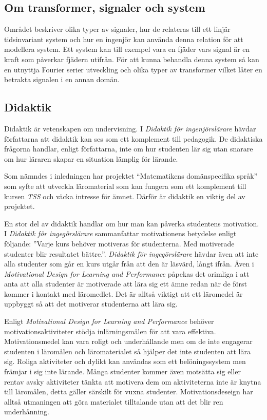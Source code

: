 \documentclass[]{article}
\begin{document}
\subsection{Om transformer, signaler och system}
Området beskriver olika typer av signaler, hur de relateras till ett
linjär tidsinvariant system och hur en ingenjör kan använda denna relation
för att modellera system. Ett system kan till exempel vara en fjäder vars
signal är en kraft som påverkar fjädern utifrån.
För att kunna behandla denna system så kan en utnyttja Fourier serier
utveckling och olika typer av transformer vilket låter en betrakta signalen
i en annan domän.

\subsection{Didaktik}
Didaktik är vetenskapen om undervisning. I \textit{Didaktik för ingenjörslärare} hävdar författarna att 
didaktik kan ses som ett komplement till pedagogik. De didaktiska frågorna handlar, enligt författarna, 
inte om hur studenten lär sig utan snarare om hur läraren skapar en situation lämplig för lärande. 

Som nämndes i inledningen har projektet “Matematikens domänspecifika språk” som syfte att utveckla 
läromaterial som kan fungera som ett komplement till kursen \textit{TSS} och väcka intresse för ämnet. 
Därför är didaktik en viktig del av projektet.

En stor del av didaktik handlar om hur man kan påverka studentens motivation. I \textit{Didaktik för 
ingegörslärare} sammanfattar motivationens betydelse enligt följande: ”Varje kurs behöver motiveras 
för studenterna. Med motiverade studenter blir resultatet bättre.”. \textit{Didaktik för ingegörslärare} 
hävdar även att inte alla studenter som går en kurs utgår från att den är läsvärd, långt ifrån. Även i 
\textit{Motivational Design for Learning and Performance} påpekas det orimliga i att anta att alla studenter är 
motiverade att lära sig ett ämne redan när de först kommer i kontakt med läromedlet. Det är alltså 
viktigt att ett läromedel är uppbyggt så att det motiverar studenterna att lära sig.

Enligt \textit{Motivational Design for Learning and Performance} behöver motivationsaktiviteter stödja 
inlärningsmålen för att vara effektiva. Motivationsmedel kan vara roligt och underhållande men om de 
inte engagerar studenten i läromålen och läromaterialet så hjälper det inte studenten att lära sig. 
Roliga aktiviteter och dylikt kan användas som ett belöningssystem men främjar i sig inte lärande. Många 
studenter kommer även motsätta sig eller rentav avsky aktiviteter tänkta att motivera dem om 
aktiviteterna inte är knytna till läromålen, detta gäller särskilt för vuxna studenter. 
Motivationsdeseign har alltså utmaningen att göra materialet tilltalande utan att det blir ren 
underhånning.
\end{document}
